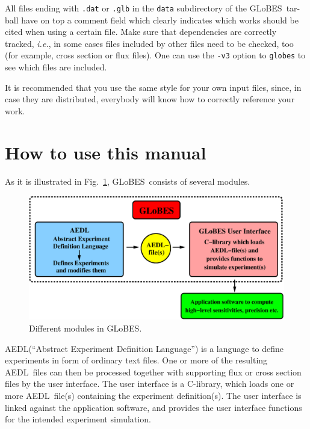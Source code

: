 \documentclass[a4paper,12pt,twoside]{book}
\newcommand{\ie}{{\it i.e.}}
\newcommand{\fig}{Fig.}
\newcommand{\GLOBES}{{\sf GLoBES}}
\newcommand{\AEDL}{{\sf AEDL}}
\newcommand{\figu}[1]{\fig~\ref{fig:#1}}
\begin{document}
All files ending with \verb+.dat+ or \verb+.glb+ 
in the \verb+data+ subdirectory of the \GLOBES\ tar-ball have on top a comment field which clearly indicates which works should be
cited when using a certain file. Make sure that dependencies are correctly
tracked, \ie , in some cases files included by other files need to be 
checked, too (for example, cross section or flux files). One can use 
the \verb+-v3+ option to \verb+globes+ to see which files
are included.

It is recommended that you use the same style for your own input files, since, in case they are distributed, everybody will know how to correctly reference your work.

\cleardoublepage
\tableofcontents

\cleardoublepage
\setcounter{page}{1}

\chapter*{How to use this manual}

As it is illustrated in \figu{GLOBES}, \GLOBES\ consists 
of several modules.
%
\begin{figure}[bht]
\begin{center}
\includegraphics[width=16cm]{GLOBES}
\end{center}
\caption{\label{fig:GLOBES} Different modules in \GLOBES .}
\end{figure}
%
\AEDL (``Abstract Experiment Definition Language'') is a language
to define experiments in form of ordinary text files. One or more of 
the resulting \AEDL\ files can then be processed together with supporting 
flux or cross section files by the user interface. The user interface
is a C-library, which loads one or more \AEDL\ file(s)
containing the experiment definition(s). The user interface is linked 
against the application software, and provides the user interface functions
for the intended experiment simulation. 
\end{document}
